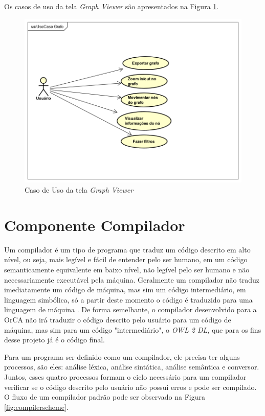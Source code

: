\documentclass{bcc}
\begin{document}
Os casos de uso da tela \textit{Graph Viewer} são apresentados na Figura \ref{fig:ucgv}.

\begin{figure}[H]
\centering
\includegraphics[width=.7\textwidth]{Figuras/UseCaseGrafo.png}
\caption{Caso de Uso da tela \textit{Graph Viewer}} 
\label{fig:ucgv}
\end{figure}

\section{Componente Compilador}

Um compilador é um tipo de programa que traduz um código descrito em alto nível, ou seja, mais legível e fácil de entender pelo ser humano, em um código semanticamente equivalente em baixo nível, não legível pelo ser humano e não necessariamente executável pela máquina. Geralmente um compilador não traduz imediatamente um código de máquina, mas sim um código intermediário, em linguagem simbólica, só a partir deste momento o código é traduzido para uma linguagem de máquina \cite{grune2012}. De forma semelhante, o compilador desenvolvido para a OrCA não irá traduzir o código descrito pelo usuário para um código de máquina, mas sim para um código "intermediário", o \textit{OWL 2 DL}, que para os fins desse projeto já é o código final.

Para um programa ser definido como um compilador, ele precisa ter alguns processos, são eles: análise léxica, análise sintática, análise semântica e conversor. Juntos, esses quatro processos formam  o ciclo necessário para um compilador verificar se o código descrito pelo usuário não possui erros e pode ser compilado. O fluxo de um compilador padrão pode ser observado na Figura \ref{fig:compilerscheme}.
\end{document}
